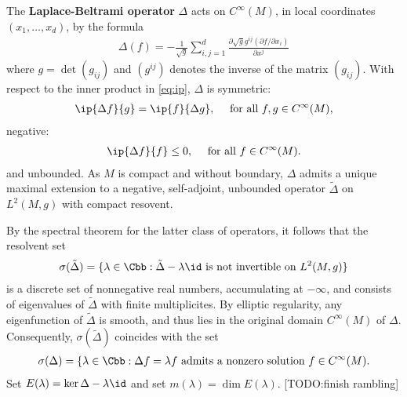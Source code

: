 The \textbf{Laplace-Beltrami operator} $\Delta$ acts on $C^\infty(M)$, in local coordinates $(x_1,\dots,x_d)$, by the formula
\begin{align}
    \Delta(f) = -\frac{1}{\sqrt{g}} \sum_{i,j=1}^d \frac{\partial \sqrt{g} g^{ij} (\partial f / \partial x_i)}{\partial x^j}
\end{align}
where $g = \det(g_{ij})$ and $(g^{ij})$ denotes the inverse of the matrix $(g_{ij})$. With respect to the inner product in \ref{eq:ip}, $\Delta$ is symmetric:
\begin{align*}
    \ip{\Delta f}{g} =\ip{ f}{\Delta g}, \quad \text{ for all $f,g \in C^\infty(M)$,}
\end{align*}
negative:
\begin{align*}
    \ip{\Delta f }{f} \leq 0, \quad \text{ for all $f \in C^\infty(M)$.}
\end{align*}
and unbounded. As $M$ is compact and without boundary, $\Delta$ admits a unique maximal extension to a negative, self-adjoint, unbounded operator  $\tilde{\Delta}$ on $L^2(M,g)$ with compact resovent.

By the spectral theorem for the latter class of operators, it follows that the resolvent set
\begin{align*}
    \sigma(\tilde{\Delta}) = \{ \lambda \in \Cbb : \tilde{\Delta} - \lambda \id \text{ is not invertible on $L^2(M,g)$}\}
\end{align*}
is a discrete set of nonnegative real numbers, accumulating at $-\infty$, and consists of eigenvalues of $\tilde{\Delta}$ with finite multiplicites. By elliptic regularity, any eigenfunction of $\tilde{\Delta}$ is smooth, and thus lies in the original domain $C^\infty(M)$ of $\Delta$. Consequently, $\sigma(\tilde{\Delta})$ coincides with the set
\begin{align*}
    \sigma(\Delta) = \{\lambda \in \Cbb : \Delta f  = \lambda f \text{ admits a nonzero  solution  $f \in C^\infty(M)$}.
\end{align*}
Set $E(\lambda) = \ker \Delta - \lambda \id$ and set $m(\lambda) = \dim E(\lambda)$. [TODO:finish rambling]

